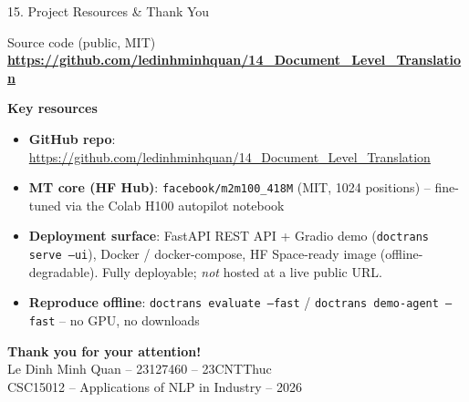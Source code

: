 \documentclass[10pt,aspectratio=169]{beamer}
\begin{document}
\begin{frame}{15. Project Resources \& Thank You}
\begin{block}{Source code (public, MIT)}
\centering
\large \textbf{\url{https://github.com/ledinhminhquan/14_Document_Level_Translation}}
\end{block}

\textbf{Key resources}
\begin{itemize}\scriptsize
  \item \textbf{GitHub repo}: \url{https://github.com/ledinhminhquan/14_Document_Level_Translation}
  \item \textbf{MT core (HF Hub)}: \texttt{facebook/m2m100\_418M} (MIT, 1024 positions) -- fine-tuned via the Colab H100 autopilot notebook
  \item \textbf{Deployment surface}: FastAPI REST API + Gradio demo (\texttt{doctrans serve --ui}), Docker / docker-compose, HF Space-ready image (offline-degradable). Fully deployable; \emph{not} hosted at a live public URL.
  \item \textbf{Reproduce offline}: \texttt{doctrans evaluate --fast} / \texttt{doctrans demo-agent --fast} -- no GPU, no downloads
\end{itemize}

\vspace{0.3cm}
\centering
\Large\textbf{Thank you for your attention!}\\[0.2cm]
\normalsize Le Dinh Minh Quan -- 23127460 -- 23CNTThuc \\
\small CSC15012 -- Applications of NLP in Industry -- 2026
\end{frame}
\end{document}
